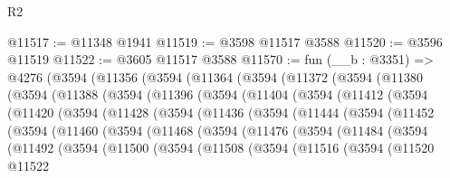 \begin{lexlean}{R2}
\begin{coremodule}
@11517 := @11348 @1941
@11519 := @3598 @11517 @3588
@11520 := @3596 @11519
@11522 := @3605 @11517 @3588
@11570 := fun (__b : @3351) =>
  @4276
    (@3594
      (@11356
        (@3594
          (@11364
            (@3594
              (@11372
                (@3594
                  (@11380
                    (@3594
                      (@11388
                        (@3594
                          (@11396
                            (@3594
                              (@11404
                                (@3594
                                  (@11412
                                    (@3594
                                      (@11420
                                        (@3594
                                          (@11428
                                            (@3594
                                              (@11436
                                                (@3594
                                                  (@11444
                                                    (@3594
                                                      (@11452
                                                        (@3594
                                                          (@11460
                                                            (@3594
                                                              (@11468
                                                                (@3594
                                                                  (@11476
                                                                    (@3594
                                                                      (@11484
                                                                        (@3594
                                                                          (@11492
                                                                            (@3594
                                                                              (@11500
                                                                                (@3594
                                                                                  (@11508
                                                                                    (@3594
                                                                                      (@11516
                                                                                        (@3594
                                                                                          (@11520
                                                                                            @11522

\end{coremodule}
\end{lexlean}

